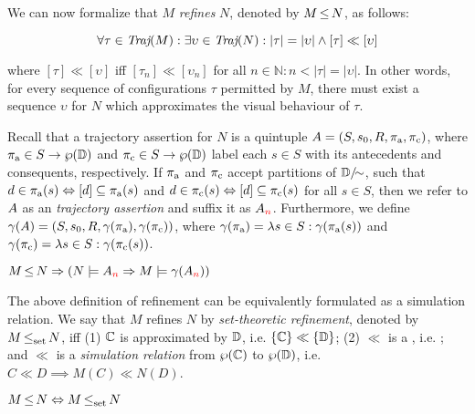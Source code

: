 

We can now formalize that $M$ \textit{refines} $N$, denoted by $M \operatorname{\leq} N$, as follows:

\begin{equation*}
\forall \tau \in \operatorname{\textit{Traj}}(M) : \exists \upsilon \in \operatorname{\textit{Traj}}(N) : | \tau | = | \upsilon | \wedge [\tau] \ll [\upsilon]
\end{equation*}

\noindent where $[\tau] \ll [\upsilon]$ iff $[\tau_{n}] \ll [\upsilon_{n}]$ for all $n \in \mathbb{N} : n < | \tau | = | \upsilon |$. In other words, for every sequence of configurations $\tau$ permitted by $M$, there must exist a sequence $\upsilon$ for $N$ which approximates the visual behaviour of $\tau$.

Recall that a trajectory assertion for $N$ is a quintuple $A = (S, s_{0}, R, \operatorname{\pi_{\textrm{a}}}, \operatorname{\pi_{\textrm{c}}})$, where $\operatorname{\pi_{\textrm{a}}} \in S \rightarrow \wp(\mathbb{D})$ and $\operatorname{\pi_{\textrm{c}}} \in S \rightarrow \wp(\mathbb{D})$ label each $s \in S$ with its antecedents and consequents, respectively. If $\operatorname{\pi_{\textrm{a}}}$ and $\operatorname{\pi_{\textrm{c}}}$ accept partitions of $\mathbb{D} / \mkern-8mu\sim$, such that $d \in \operatorname{\pi_{\textrm{a}}}(s) \Leftrightarrow [d] \subseteq \operatorname{\pi_{\textrm{a}}}(s)$ and $d \in \operatorname{\pi_{\textrm{c}}}(s) \Leftrightarrow [d] \subseteq \operatorname{\pi_{\textrm{c}}}(s)$ for all $s \in S$, then we refer to $A$ as an \textit{ trajectory assertion} and suffix it as $A_{\textcolor{red}{n}}$. Furthermore, we define $\gamma(A) = (S, s_{0}, R, \gamma(\operatorname{\pi_{\textrm{a}}}), \gamma(\operatorname{\pi_{\textrm{c}}}))$, where $\gamma(\operatorname{\pi_{\textrm{a}}}) = \lambda s \in S : \gamma(\operatorname{\pi_{\textrm{a}}}(s))$ and $\gamma(\operatorname{\pi_{\textrm{c}}}) = \lambda s \in S : \gamma(\operatorname{\pi_{\textrm{c}}}(s))$.


\begin{theorem} \label{thm:traj-refines}
$M \operatorname{\leq} N \Rightarrow (N \models A_{\textcolor{red}{n}} \Rightarrow M \models \gamma(A_{\textcolor{red}{n}}))$
\end{theorem}

The above definition of refinement can be equivalently formulated as a simulation relation. We say that $M$ refines $N$ by \textit{set-theoretic refinement}, denoted by $M \operatorname{\operatorname{\leq}_{\textrm{set}}} N$, iff (1) $\mathbb{C}$ is approximated by $\mathbb{D}$, i.e. $\{ \mathbb{C} \} \ll \{ \mathbb{D} \}$; (2) $\ll$ is a , i.e. ; and $\ll$ is a \textit{simulation relation} from $\wp(\mathbb{C})$ to $\wp(\mathbb{D})$, i.e. $C \ll D \implies M(C) \ll N(D)$.


\begin{theorem} \label{thm:traj-equal-set}
$M \operatorname{\leq} N \Leftrightarrow M \operatorname{\operatorname{\leq}_{\textrm{set}}} N$
\end{theorem}
